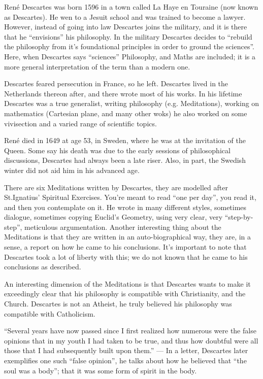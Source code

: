 \documentclass{article}
\begin{document}
    \begin{spacing}{1.2}
    \newpage
    René Descartes was born 1596 in a town called La Haye en Touraine
    (now known as Descartes). He wen to a Jesuit school and was trained to
    become a lawyer. However, instead of going into law Descartes joins the
    military, and it is there that he ``envisions'' his philosophy. In the 
    military Descartes decides to ``rebuild the philosophy from it's 
    foundational principles in order to ground the sciences''. Here,
    when Descartes says ``sciences'' Philosophy, and Maths are included;
    it is a more general interpretation of the term than a modern one.

    Descartes feared persecution in France, so he left. Descartes lived in 
    the Netherlands thereon after, and there wrote most of his works. In 
    his lifetime Descartes was a true generalist, writing philosophy (e.g. 
    Meditations), working on mathematics (Cartesian plane, and many other woks)
    he also worked on some vivisection and a varied range of scientific topics.

    René died in 1649 at age 53, in Sweden, where he was at the invitation of
    the Queen. Some say his death was due to the early sessions of
    philosophical discussions, Descartes had always been a late riser. Also, 
    in part, the Swedish winter did not aid him in his advanced age.

    There are six Meditations written by Descartes, they are modelled after
    St.Ignatius' Spiritual Exercises. You're meant to read ``one per day'',
    you read it, and then you contemplate on it. He wrote in many different
    styles, sometimes dialogue, sometimes copying Euclid's Geometry, using 
    very clear, very ``step-by-step'', meticulous argumentation. Another 
    interesting thing about the Meditations is that they are written in an 
    auto-biographical way, they are, in a sense, a report on how he came to
    his conclusions. It's important to note that Descartes took a lot of
    liberty with this; we do not known that he came to his conclusions as 
    described.

    An interesting dimension of the Meditations is that Descartes wants to
    make it exceedingly clear that his philosophy is compatible with 
    Christianity, and the Church. Descartes is not an Atheist, he truly 
    believed his philosophy was compatible with Catholicism. 

    ``Several years have now passed since I first realized how numerous were
    the false opinions that in my youth I had taken to be true, and thus how
    doubtful were all those that I had subsequently built upon them.''%
\footnotemark[1]%
    --- In a letter, Descartes later exemplifies one such ``false opinion'', he
    talks about how he believed that ``the soul was a body''; that it was some
    form of spirit in the body.


\end{spacing}
\end{document}
